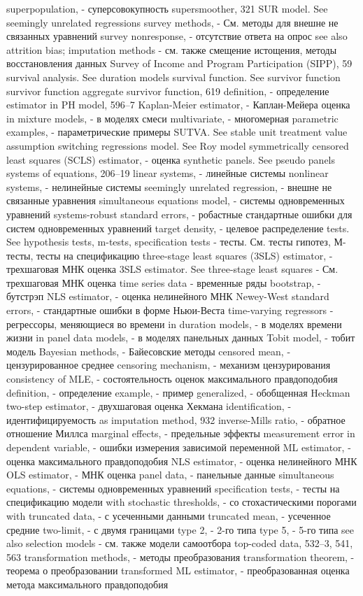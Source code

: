 superpopulation, - суперсовокупность
supersmoother, 321
SUR model. See seemingly unrelated regressions survey methods, - См. методы для внешне не связанных уравнений
survey nonresponse, - отсутствие ответа на опрос
see also attrition bias; imputation methods - см. также смещение истощения, методы восстановления данных
Survey of Income and Program Participation (SIPP),
59
survival analysis. See duration models survival function. See survivor function survivor function
aggregate survivor function, 619 
definition, - определение
estimator in PH model, 596–7
Kaplan-Meier estimator, - Каплан-Мейера оценка
in mixture models, - в моделях смеси
multivariate, - многомерная
parametric examples, - параметрические примеры
SUTVA. See stable unit treatment value assumption switching regressions model. See Roy model symmetrically censored least squares (SCLS)
estimator, - оценка
synthetic panels. See pseudo panels systems of equations, 206–19
linear systems, - линейные системы
nonlinear systems, - нелинейные системы
seemingly unrelated regression, - внешне не связанные уравнения
simultaneous equations model, - системы одновременных уравнений
systems-robust standard errors, - робастные стандартные ошибки для систем одновременных уравнений
target density, - целевое распределение
tests. See hypothesis tests, m-tests, specification tests - тесты. См. тесты гипотез, М-тесты, тесты на спецификацию
three-stage least squares (3SLS) estimator, - трехшаговая МНК оценка
3SLS estimator. See three-stage least squares - См. трехшаговая МНК оценка
time series data - временные ряды
bootstrap, - бутстрэп
NLS estimator, - оценка нелинейного МНК
Newey-West standard errors, - стандартные ошибки в форме Ньюи-Веста
time-varying regressors - регрессоры, меняющиеся во времени
in duration models, - в моделях времени жизни
in panel data models, - в моделях панельных данных
Tobit model, - тобит модель
Bayesian methods, - Байесовские методы 
censored mean, - цензурированное среднее
censoring mechanism, - механизм цензурирования
consistency of MLE, - состоятельность оценок максимального правдоподобия
definition, - определение
example, - пример
generalized, - обобщенная
Heckman two-step estimator, - двухшаговая оценка Хекмана 
identification, - идентифицируемость
as imputation method, 932
inverse-Mills ratio, - обратное отношение Миллса
marginal effects, - предельные эффекты
measurement error in dependent variable, - ошибки измерения зависимой переменной
ML estimator, - оценка максимального правдоподобия
NLS estimator, - оценка нелинейного МНК
OLS estimator, - МНК оценка
panel data, - панельные данные
simultaneous equations, - системы одновременных уравнений
specification tests, - тесты на спецификацию модели
with stochastic thresholds, - со стохастическими порогами
with truncated data, - с усеченными данными
truncated mean, - усеченное средние
two-limit, - с двумя границами
type 2, - 2-го типа
type 5, - 5-го типа
see also selection models - см. также модели самоотбора
top-coded data, 532–3, 541, 563 
transformation methods, - методы преобразования
transformation theorem, - теорема о преобразовании
transformed ML estimator, - преобразованная оценка метода максимального правдоподобия

